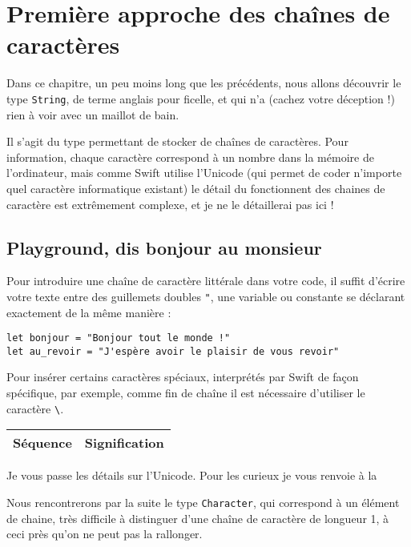 \chapter{Première approche des chaînes de caractères}
Dans ce chapitre, un peu moins long que les précédents, nous allons découvrir le type \texttt{String}, de terme anglais pour ficelle, et qui n'a (cachez votre déception !) rien à voir avec un maillot de bain.

Il s'agit du type permettant de stocker de chaînes de caractères. Pour information, chaque caractère correspond à un nombre dans la mémoire de l'ordinateur, mais comme Swift utilise l'Unicode (qui permet de coder n'importe quel caractère informatique existant) le détail du fonctionnent des chaines de caractère est extrêmement complexe, et je ne le détaillerai pas ici !
\section{Playground, dis bonjour au monsieur}
Pour introduire une chaîne de caractère littérale dans votre code, il suffit d'écrire votre texte entre des guillemets doubles \verb'"', une variable ou constante se déclarant exactement de la même manière :
\begin{listing}[h]
\begin{verbatim}
let bonjour = "Bonjour tout le monde !"
let au_revoir = "J'espère avoir le plaisir de vous revoir"
\end{verbatim}
\end{listing}

Pour insérer certains caractères spéciaux, interprétés par Swift de façon spécifique, par exemple, comme fin de chaîne il est nécessaire d'utiliser le caractère \verb"\".
\begin{longtabu} to \linewidth {|X[1,l,m]|X[4,l,m]|}
\hline
Séquence & Signification \\ \hline
\endhead

\end{longtabu}

Je vous passe les détails sur l'Unicode. Pour les curieux je vous renvoie à la 

Nous rencontrerons par la suite le type \texttt{Character}, qui correspond à un élément de chaine, très difficile à distinguer d'une chaîne de caractère de longueur 1, à ceci près qu'on ne peut pas la rallonger.
